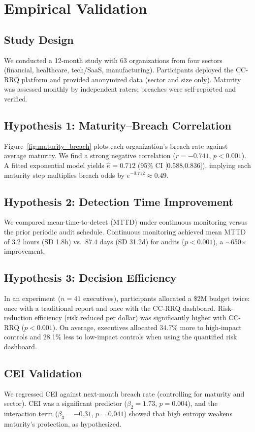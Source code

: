 \documentclass[conference]{IEEEtran}
\begin{document}
\section{Empirical Validation}
\label{sec:experiments}

\subsection{Study Design}
We conducted a 12-month study with 63 organizations from four sectors (financial, healthcare, tech/SaaS, manufacturing). Participants deployed the CC-RRQ platform and provided anonymized data (sector and size only). Maturity was assessed monthly by independent raters; breaches were self-reported and verified.

\subsection{Hypothesis 1: Maturity--Breach Correlation}
Figure~\ref{fig:maturity_breach} plots each organization's breach rate against average maturity. We find a strong negative correlation ($r=-0.741$, $p<0.001$). A fitted exponential model yields $\hat\kappa=0.712$ (95\% CI [0.588,0.836]), implying each maturity step multiplies breach odds by $e^{-0.712}\approx0.49$.

\subsection{Hypothesis 2: Detection Time Improvement}
We compared mean-time-to-detect (MTTD) under continuous monitoring versus the prior periodic audit schedule. Continuous monitoring achieved mean MTTD of 3.2 hours (SD 1.8h) vs.\ 87.4 days (SD 31.2d) for audits ($p<0.001$), a $\sim$650$\times$ improvement.

\subsection{Hypothesis 3: Decision Efficiency}
In an experiment ($n=41$ executives), participants allocated a \$2M budget twice: once with a traditional report and once with the CC-RRQ dashboard. Risk-reduction efficiency (risk reduced per dollar) was significantly higher with CC-RRQ ($p<0.001$). On average, executives allocated 34.7\% more to high-impact controls and 28.1\% less to low-impact controls when using the quantified risk dashboard.

\subsection{CEI Validation}
We regressed CEI against next-month breach rate (controlling for maturity and sector). CEI was a significant predictor ($\beta_2=1.73$, $p=0.004$), and the interaction term ($\beta_3=-0.31$, $p=0.041$) showed that high entropy weakens maturity's protection, as hypothesized.
\end{document}
